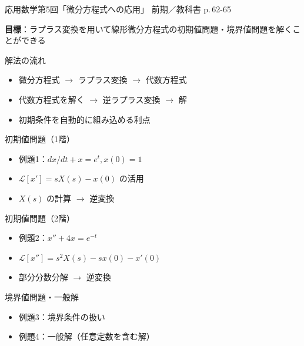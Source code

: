\documentclass[aspectratio=43,professionalfonts,handout]{beamer}
\newcommand{\LectureNum}{5}
\newcommand{\LectureTitle}{微分方程式への応用}
\newcommand{\TextPages}{p.\,62-65}
\newcommand{\CourseName}{応用数学}
\renewcommand{\TermName}{前期}
\begin{document}
\begin{frame}{\CourseName\quad 第\LectureNum 回「\LectureTitle」}
  {\small \TermName\quad \TeacherName\quad ／\quad 教科書 \TextPages}

  \textbf{目標}：ラプラス変換を用いて線形微分方程式の初期値問題・境界値問題を解くことができる

\end{frame}

\begin{frame}{解法の流れ}
  \begin{block}{}
  \begin{itemize}
    \item 微分方程式 $ \to $ ラプラス変換 $ \to $ 代数方程式
    \item 代数方程式を解く $ \to $ 逆ラプラス変換 $ \to $ 解
    \item 初期条件を自動的に組み込める利点
  \end{itemize}
  \end{block}
\end{frame}

\begin{frame}{初期値問題（1階）}
  \begin{block}{}
  \begin{itemize}
    \item 例題1：$dx/dt + x = e^t, x(0)=1$
    \item $\mathcal{L}[x'] = sX(s) - x(0)$ の活用
    \item $X(s)$ の計算 $ \to $ 逆変換
  \end{itemize}
  \end{block}
\end{frame}

\begin{frame}{初期値問題（2階）}
  \begin{block}{}
  \begin{itemize}
    \item 例題2：$x'' + 4x = e^{-t}$
    \item $\mathcal{L}[x''] = s^{2}X(s) - sx(0) - x'(0)$
    \item 部分分数分解 $ \to $ 逆変換
  \end{itemize}
  \end{block}
\end{frame}

\begin{frame}{境界値問題・一般解}
  \begin{block}{}
  \begin{itemize}
    \item 例題3：境界条件の扱い
    \item 例題4：一般解（任意定数を含む解）
  \end{itemize}
  \end{block}
\end{frame}
\end{document}
